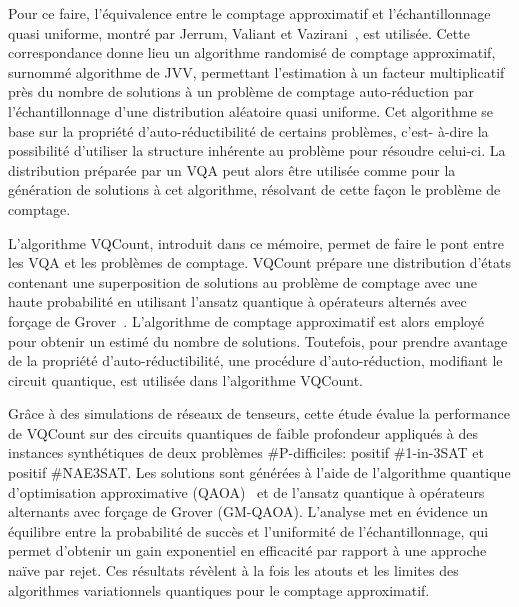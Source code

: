 Pour ce faire, l'équivalence entre le comptage approximatif et l'échantillonnage quasi uniforme, montré par Jerrum, Valiant et Vazirani~\cite{jerrumRandomGenerationCombinatorial1986}, est utilisée. Cette correspondance donne lieu un algorithme randomisé de comptage approximatif, surnommé algorithme de JVV, permettant l'estimation à un facteur multiplicatif près du nombre de solutions à un problème de comptage auto-réduction par l'échantillonnage d'une distribution aléatoire quasi uniforme. Cet algorithme se base sur la propriété d'auto-réductibilité de certains problèmes, c'est-
à-dire la possibilité d'utiliser la structure inhérente au problème pour résoudre celui-ci. La distribution préparée par un VQA peut alors être utilisée comme pour la génération de solutions à cet algorithme, résolvant de cette façon le problème de comptage. 

L'algorithme VQCount, introduit dans ce mémoire, permet de faire le pont entre les VQA et les problèmes de comptage. VQCount prépare une distribution d'états contenant une superposition de solutions au problème de comptage avec une haute probabilité en utilisant l'ansatz quantique à opérateurs alternés avec forçage de Grover~\cite{bartschiGroverMixersQAOA2020}. L'algorithme de comptage approximatif est alors employé pour obtenir un estimé du nombre de solutions. Toutefois, pour prendre avantage de la propriété d'auto-réductibilité, une procédure d'auto-réduction, modifiant le circuit quantique, est utilisée dans l'algorithme VQCount. 

Grâce à des simulations de réseaux de tenseurs, cette étude évalue la performance de VQCount sur des circuits quantiques de faible profondeur appliqués à des instances synthétiques de deux problèmes \textsf{\#P}-difficiles: positif \#1-in-3SAT et positif \#NAE3SAT. Les solutions sont générées à l'aide de l'algorithme quantique d'optimisation approximative (QAOA)~\cite{farhiQuantumApproximateOptimization2014} et de l'ansatz quantique à opérateurs alternants avec forçage de Grover (GM-QAOA). L'analyse met en évidence un équilibre entre la probabilité de succès et l'uniformité de l'échantillonnage, qui permet d'obtenir un gain exponentiel en efficacité par rapport à une approche naïve par rejet. Ces résultats révèlent à la fois les atouts et les limites des algorithmes variationnels quantiques pour le comptage approximatif.


